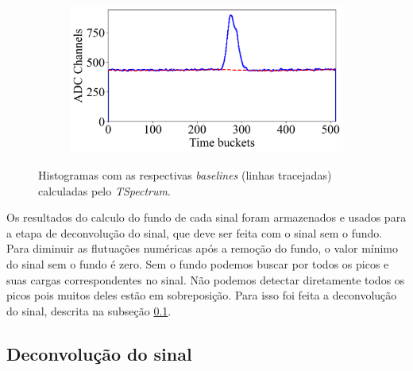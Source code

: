 \documentclass[a4paper,12pt,oneside]{book}
\begin{document}
\begin{figure}[H]
\begin{subfigure}[b]{0.48\textwidth}
        \caption{}
        \label{subfig:ex_sinal_bkg_3}
    \end{subfigure}%
    \hfill
    \begin{subfigure}[b]{0.48\textwidth}
        \centering
        \includegraphics[scale=0.395]{figs/ex_sinal_bkg_4.png}
        \caption{}
        \label{subfig:ex_sinal_bkg_4}
    \end{subfigure}
\caption{Histogramas com as respectivas \textit{baselines} (linhas tracejadas) calculadas pelo \textit{TSpectrum}.}
\label{fig:ex_sinal_bkg}
\end{figure}

\par Os resultados do calculo do fundo de cada sinal foram armazenados e usados para a etapa de deconvolução do sinal, que deve ser feita com o sinal sem o fundo. Para diminuir as flutuações numéricas após a remoção do fundo, o valor mínimo do sinal sem o fundo é zero. Sem o fundo podemos buscar por todos os picos e suas cargas correspondentes no sinal. Não podemos detectar diretamente todos os picos pois muitos deles estão em sobreposição. Para isso foi feita a deconvolução do sinal, descrita na subseção \ref{subsec:pulses_deconv}.



\subsection{Deconvolução do sinal}\label{subsec:pulses_deconv}

\end{document}
